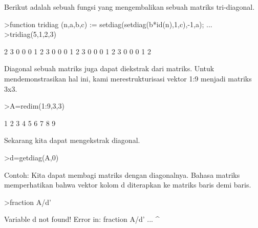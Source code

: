 \documentclass{article}
\begin{document}
\begin{eulernotebook}
\begin{eulercomment}
Berikut adalah sebuah fungsi yang mengembalikan sebuah matriks
tri-diagonal.
\end{eulercomment}
\begin{eulerprompt}
>function tridiag (n,a,b,c) := setdiag(setdiag(b*id(n),1,c),-1,a); ...
>tridiag(5,1,2,3)
\end{eulerprompt}
\begin{euleroutput}
              2             3             0             0             0 
              1             2             3             0             0 
              0             1             2             3             0 
              0             0             1             2             3 
              0             0             0             1             2 
\end{euleroutput}
\begin{eulercomment}
Diagonal sebuah matriks juga dapat diekstrak dari matriks. Untuk
mendemonstrasikan hal ini, kami merestrukturisasi vektor 1:9 menjadi
matriks 3x3.
\end{eulercomment}
\begin{eulerprompt}
>A=redim(1:9,3,3)
\end{eulerprompt}
\begin{euleroutput}
              1             2             3 
              4             5             6 
              7             8             9 
\end{euleroutput}
\begin{eulercomment}
Sekarang kita dapat mengekstrak diagonal.
\end{eulercomment}
\begin{eulerprompt}
>d=getdiag(A,0)
\end{eulerprompt}
\begin{euleroutput}
  [1,  5,  9]
\end{euleroutput}
\begin{eulercomment}
Contoh: Kita dapat membagi matriks dengan diagonalnya. Bahasa matriks
memperhatikan bahwa vektor kolom d diterapkan ke matriks baris demi
baris.
\end{eulercomment}
\begin{eulerprompt}
>fraction A/d'
\end{eulerprompt}
\begin{euleroutput}
  Variable d not found!
  Error in:
  fraction A/d' ...
               ^
\end{euleroutput}
\begin{eulerprompt}

\end{eulerprompt}
\end{eulernotebook}
\end{document}
